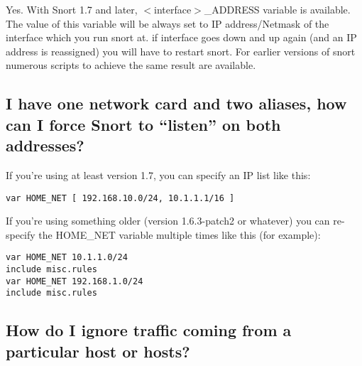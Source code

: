 \documentclass{article}
\begin{document}
Yes.  With Snort 1.7 and later, $<$interface$>$\_ADDRESS variable is available.
The value of this variable will be always set to IP address/Netmask of the
interface which you run snort at. if interface goes down and up again (and
an IP address is reassigned) you will have to restart snort. For earlier
versions of snort numerous scripts to achieve the same result are
available.


\subsection{I have one network card and two aliases, how can I force Snort to ``listen'' on both addresses?}

If you're using at least version 1.7, you can specify an IP list like
this:

\begin{verbatim}var HOME_NET [ 192.168.10.0/24, 10.1.1.1/16 ]\end{verbatim}

If you're using something older (version 1.6.3-patch2 or whatever) you can
re-specify the HOME\_NET variable multiple times like this (for example):

\begin{verbatim}
var HOME_NET 10.1.1.0/24
include misc.rules
var HOME_NET 192.168.1.0/24
include misc.rules
\end{verbatim}

\subsection{How do I ignore traffic coming from a particular host or hosts?}
\end{document}
